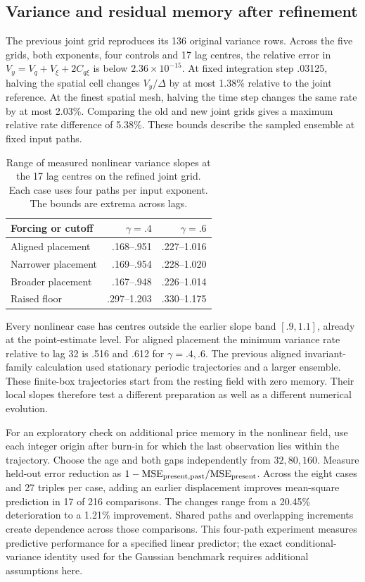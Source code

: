 \documentclass[11pt]{article}
\begin{document}
\subsection{Variance and residual memory after refinement}
The previous joint grid reproduces its 136 original variance rows.
Across the five grids, both exponents, four controls and 17 lag centres,
the relative error in \(V_y=V_q+V_\xi+2C_{q\xi}\) is below
\(2.36\times10^{-15}\). At fixed integration step .03125, halving
the spatial cell changes \(V_y/\Delta\) by at most 1.38\% relative
to the joint reference. At the finest spatial mesh, halving the
time step changes the same rate by at most 2.03\%. Comparing the old
and new joint grids gives a maximum relative rate difference of 5.38\%.
These bounds describe the sampled ensemble at fixed input paths.
\begin{table}[htbp]\centering\small
\caption{Range of measured nonlinear variance slopes at the 17 lag
centres on the refined joint grid. Each case uses four paths per input
exponent. The bounds are extrema across lags.}
\begin{tabular}{lrr}\toprule
Forcing or cutoff & \(\gamma=.4\) & \(\gamma=.6\)\\\midrule
Aligned placement & .168--.951 & .227--1.016\\
Narrower placement & .169--.954 & .228--1.020\\
Broader placement & .167--.948 & .226--1.014\\
Raised floor & .297--1.203 & .330--1.175\\\bottomrule
\end{tabular}\label{tab:window-nonlinear-variance}\end{table}
Every nonlinear case has centres outside the earlier slope band
\([.9,1.1]\), already at the point-estimate level. For aligned placement
the minimum variance rate relative to lag 32 is .516 and .612 for
\(\gamma=.4,.6\). The previous aligned invariant-family calculation
used stationary periodic trajectories and a larger ensemble. These
finite-box trajectories start from the resting field with zero memory.
Their local slopes therefore test a different preparation as well as a
different numerical evolution.

For an exploratory check on additional price memory in the nonlinear
field, use each integer origin after burn-in for which the last
observation lies within the trajectory. Choose the age and both gaps
independently from \(32,80,160\). Measure held-out error reduction as
\(1-\mathrm{MSE}_{\rm present,past}/\mathrm{MSE}_{\rm present}\).
Across the eight cases and 27 triples per case, adding an earlier
displacement improves mean-square prediction in 17 of 216 comparisons.
The changes range from a 20.45\% deterioration to a 1.21\% improvement.
Shared paths and overlapping increments create dependence across those
comparisons. This four-path experiment measures predictive performance
for a specified linear predictor; the exact conditional-variance identity
used for the Gaussian benchmark requires additional assumptions here.
\end{document}
